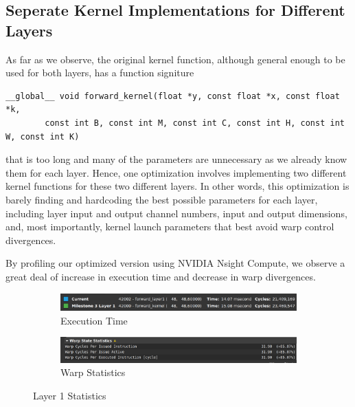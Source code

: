 \documentclass{article}
\begin{document}
\subsection{Seperate Kernel Implementations for Different Layers}
As far as we observe, the original kernel function, although general enough to be used for both layers, has a function signiture
\begin{verbatim}
__global__ void forward_kernel(float *y, const float *x, const float *k,
        const int B, const int M, const int C, const int H, const int W, const int K)
\end{verbatim}
that is too long and many of the parameters are unnecessary as we already know them for each layer. Hence, one optimization involves
implementing two different kernel functions for these two different layers. In other words, this optimization is barely finding and hardcoding
the best possible parameters for each layer, including layer input and output channel numbers, input and output dimensions, and, most importantly,
kernel launch parameters that best avoid warp control divergences.
\par
By profiling our optimized version using NVIDIA Nsight Compute, we observe a great deal of increase in execution time and decrease in
warp divergences.

\begin{figure}[H]
    \centering
    \begin{subfigure}[b]{\linewidth}
        \includegraphics[width=\linewidth]{2kern_layer1_runtime}
        \caption{Execution Time}
    \end{subfigure}
    \begin{subfigure}[b]{\linewidth}
        \includegraphics[width=\linewidth]{2kern_layer1_warp}
        \caption{Warp Statistics}
    \end{subfigure}
    \caption{Layer 1 Statistics}
\end{figure}
\end{document}
